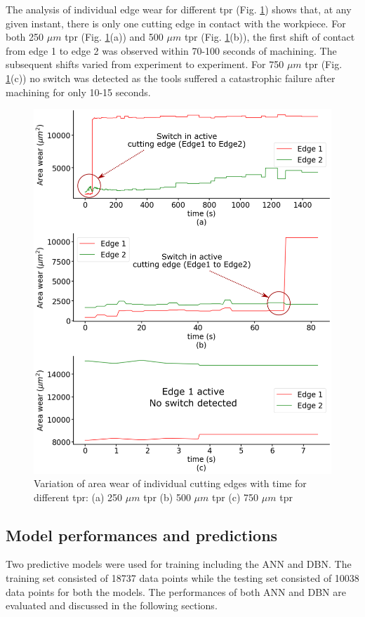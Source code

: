 \documentclass[preprint,review,12pt]{elsarticle}
\begin{document}
The analysis of individual edge wear for different tpr (Fig. \ref{fig:fig54}) shows that, at any given instant, there is only one cutting edge in contact with the workpiece. For both 250 $\mu{m}$ tpr (Fig. \ref{fig:fig54}(a)) and 500 $\mu{m}$ tpr (Fig. \ref{fig:fig54}(b)), the first shift of contact from edge 1 to edge 2 was observed within 70-100 seconds of machining. The subsequent shifts varied from experiment to experiment. For 750 $\mu{m}$ tpr (Fig. \ref{fig:fig54}(c)) no switch was detected as the tools suffered a catastrophic failure after machining for only 10-15 seconds.

\begin{figure}[!h]
  \begin{center}
    \includegraphics[width=0.7\linewidth]{54.png}
    \caption{Variation of area wear of individual cutting edges with time for different tpr: (a) 250 $\mu{m}$ tpr (b) 500 $\mu{m}$ tpr (c) 750 $\mu{m}$ tpr}\label{fig:fig54}
  \end{center}
\end{figure}


\subsection{Model performances and predictions}\label{sec:sec52}
Two predictive models were used for training including the ANN and DBN. The training set consisted of 18737 data points while the testing set consisted of 10038 data points for both the models. The performances of both ANN and DBN are evaluated and discussed in the following sections. \par
\end{document}
